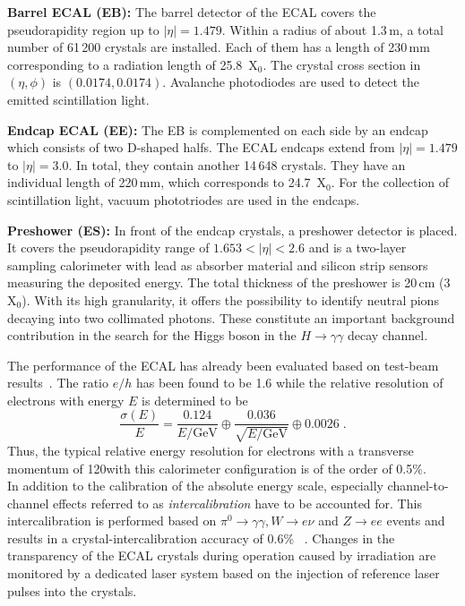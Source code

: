 \begin{description}
 \item \textbf{Barrel ECAL (EB):} The barrel detector of the ECAL covers the pseudorapidity region up to $|\eta| = 1.479$. Within a radius of about 1.3\,m, a total number of 61\,200 crystals are installed. Each of them has a length of 230\,mm corresponding to a radiation length of 25.8~$\mathrm{X_0}$. The crystal cross section in $(\eta, \phi)$ is $(0.0174, 0.0174)$. Avalanche photodiodes are used to detect the emitted scintillation light.
 \item \textbf{Endcap ECAL (EE):} The EB is complemented on each side by an endcap which consists of two D-shaped halfs. The ECAL endcaps extend from $|\eta| = 1.479$ to $|\eta| = 3.0$. In total, they contain another 14\,648 crystals. They have an individual length of 220\,mm, which corresponds to 24.7~$\mathrm{X}_0$. For the collection of scintillation light, vacuum phototriodes are used in the endcaps.
 \item \textbf{Preshower (ES):} In front of the endcap crystals, a preshower detector is placed. It covers the pseudorapidity range of $1.653 < |\eta| <2.6$ and is a two-layer sampling calorimeter with lead as absorber material and silicon strip sensors measuring the deposited energy. The total thickness of the preshower is 20\,cm (3~$\mathrm{X_0}$). With its high granularity, it offers the possibility to identify neutral pions decaying into two collimated photons. These constitute an important background contribution in the search for the Higgs boson in the $H \rightarrow \gamma \gamma$ decay channel.
\end{description}
The performance of the ECAL has already been evaluated based on test-beam results~\cite{Abramov:2000vd, springerlink:10.1140/epjc/s10052-009-0959-5}. The ratio $e/h$ has been found to be 1.6 while the relative resolution of electrons with energy $E$ is determined to be
\begin{equation}
\frac{\sigma(E)}{E}= \frac{0.124}{E/\mathrm{GeV}} \oplus \frac{0.036}{\sqrt{E/\mathrm{GeV}}} \oplus 0.0026 \; .
\end{equation}
Thus, the typical relative energy resolution for electrons with a transverse momentum of 120\gev with this calorimeter configuration is of the order of 0.5\%. \\
In addition to the calibration of the absolute energy scale, especially channel-to-channel effects referred to as \textit{intercalibration} have to be accounted for. This intercalibration is performed based on $\pi^0 \rightarrow \gamma \gamma, W \rightarrow e\nu$ and $Z \rightarrow ee$ events and results in a crystal-intercalibration accuracy of 0.6\% ~\cite{Chatrchyan:2013dga}. Changes in the transparency of the ECAL crystals during operation caused by irradiation are monitored by a dedicated laser system based on the injection of reference laser pulses into the crystals. \\


